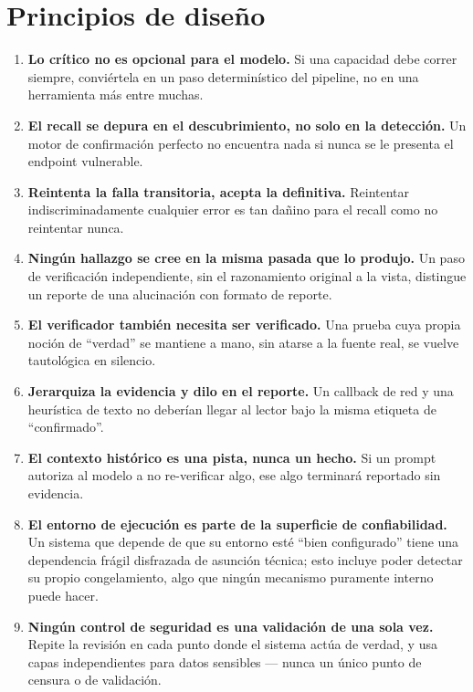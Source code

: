 \documentclass[10pt]{article}
\begin{document}
\section{Principios de diseño}

\begin{enumerate}
\item \textbf{Lo crítico no es opcional para el modelo.} Si una capacidad debe correr siempre, conviértela en un paso determinístico del pipeline, no en una herramienta más entre muchas.
\item \textbf{El recall se depura en el descubrimiento, no solo en la detección.} Un motor de confirmación perfecto no encuentra nada si nunca se le presenta el endpoint vulnerable.
\item \textbf{Reintenta la falla transitoria, acepta la definitiva.} Reintentar indiscriminadamente cualquier error es tan dañino para el recall como no reintentar nunca.
\item \textbf{Ningún hallazgo se cree en la misma pasada que lo produjo.} Un paso de verificación independiente, sin el razonamiento original a la vista, distingue un reporte de una alucinación con formato de reporte.
\item \textbf{El verificador también necesita ser verificado.} Una prueba cuya propia noción de ``verdad'' se mantiene a mano, sin atarse a la fuente real, se vuelve tautológica en silencio.
\item \textbf{Jerarquiza la evidencia y dilo en el reporte.} Un callback de red y una heurística de texto no deberían llegar al lector bajo la misma etiqueta de ``confirmado''.
\item \textbf{El contexto histórico es una pista, nunca un hecho.} Si un prompt autoriza al modelo a no re-verificar algo, ese algo terminará reportado sin evidencia.
\item \textbf{El entorno de ejecución es parte de la superficie de confiabilidad.} Un sistema que depende de que su entorno esté ``bien configurado'' tiene una dependencia frágil disfrazada de asunción técnica; esto incluye poder detectar su propio congelamiento, algo que ningún mecanismo puramente interno puede hacer.
\item \textbf{Ningún control de seguridad es una validación de una sola vez.} Repite la revisión en cada punto donde el sistema actúa de verdad, y usa capas independientes para datos sensibles --- nunca un único punto de censura o de validación.
\end{enumerate}
\end{document}
